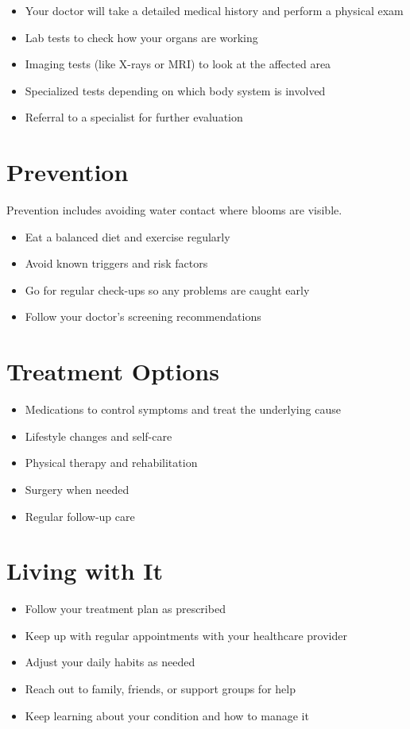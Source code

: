 \begin{itemize}[noitemsep]
  \item Your doctor will take a detailed medical history and perform a physical exam
  \item Lab tests to check how your organs are working
  \item Imaging tests (like X-rays or MRI) to look at the affected area
  \item Specialized tests depending on which body system is involved
  \item Referral to a specialist for further evaluation
\end{itemize}

\section{Prevention}
Prevention includes avoiding water contact where blooms are visible.

\begin{itemize}[noitemsep]
  \item Eat a balanced diet and exercise regularly
  \item Avoid known triggers and risk factors
  \item Go for regular check-ups so any problems are caught early
  \item Follow your doctor's screening recommendations
\end{itemize}

\section{Treatment Options}

\begin{itemize}[noitemsep]
  \item Medications to control symptoms and treat the underlying cause
  \item Lifestyle changes and self-care
  \item Physical therapy and rehabilitation
  \item Surgery when needed
  \item Regular follow-up care
\end{itemize}

\section{Living with It}

\begin{itemize}[noitemsep]
  \item Follow your treatment plan as prescribed
  \item Keep up with regular appointments with your healthcare provider
  \item Adjust your daily habits as needed
  \item Reach out to family, friends, or support groups for help
  \item Keep learning about your condition and how to manage it
\end{itemize}


